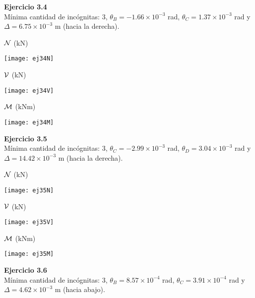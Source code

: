 \textbf{Ejercicio 3.4}\\

Mínima cantidad de incógnitas: 3, $\theta_B = -1.66 \times 10^{-3}$ rad, $\theta_C = 1.37 \times 10^{-3}$ rad y $\Delta = 6.75 \times 10^{-3}$ m (hacia la derecha).


${\mathcal N}$ (kN)

\begin{center}
	\texttt{[image: ej34N]}
\end{center}

${\mathcal V}$ (kN)

\begin{center}
	\texttt{[image: ej34V]}
\end{center}

${\mathcal M}$ (kNm)

\begin{center}
	\texttt{[image: ej34M]}
\end{center}



\textbf{Ejercicio 3.5}\\

Mínima cantidad de incógnitas: 3, $\theta_C = -2.99 \times 10^{-3}$ rad, $ \theta_D = 3.04 \times 10^{-3}$ rad y $\Delta  = 14.42 \times 10^{-3}$ m (hacia la derecha).
%

${\mathcal N}$ (kN)

\begin{center}
	\texttt{[image: ej35N]}
\end{center}

${\mathcal V}$ (kN)

\begin{center}
	\texttt{[image: ej35V]}
\end{center}

${\mathcal M}$ (kNm)

\begin{center}
	\texttt{[image: ej35M]}
\end{center}




\textbf{Ejercicio 3.6}\\

Mínima cantidad de incógnitas: 3, $\theta_B = 8.57 \times 10^{-4}$ rad, $\theta_C = 3.91 \times 10^{-4}$ rad y $\Delta  = 4.62 \times 10^{-3} $ m (hacia abajo).

